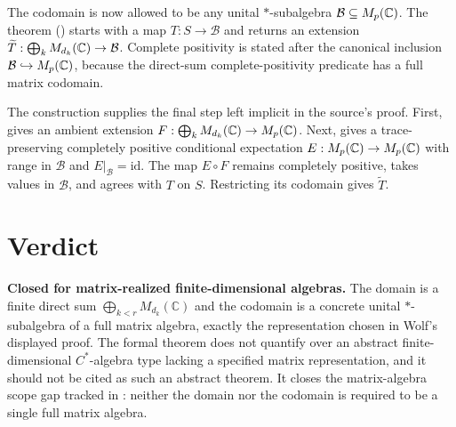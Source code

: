 \documentclass{article}
\begin{document}
The codomain is now allowed to be any unital $*$-subalgebra
$\mathcal B\subseteq M_{p}(\mathbb{C})$. The theorem
() starts with a
map $T:S\to\mathcal B$ and returns an extension
$\widetilde T:\bigoplus_kM_{d_k}(\mathbb{C})\to\mathcal B$. Complete positivity is stated
after the canonical inclusion $\mathcal B\hookrightarrow M_{p}(\mathbb{C})$, because the
direct-sum complete-positivity predicate has a full matrix codomain.

The construction supplies the final step left implicit in the source's proof.
First,  gives an
ambient extension $F:\bigoplus_kM_{d_k}(\mathbb{C})\to M_{p}(\mathbb{C})$. Next,
 gives a
trace-preserving completely positive conditional expectation
$E:M_{p}(\mathbb{C})\to M_{p}(\mathbb{C})$ with range in $\mathcal B$ and $E|_{\mathcal B}=\mathrm{id}$.
The map $E\circ F$ remains completely positive, takes values in $\mathcal B$,
and agrees with $T$ on $S$. Restricting its codomain gives $\widetilde T$.

\section{Verdict}

\textbf{Closed for matrix-realized finite-dimensional algebras.} The domain is
a finite direct sum $\bigoplus_{k<r}M_{d_k}(\mathbb C)$ and the codomain is a
concrete unital $*$-subalgebra of a full matrix algebra, exactly the
representation chosen in Wolf's displayed proof. The formal theorem does not
quantify over an abstract finite-dimensional $C^*$-algebra type lacking a
specified matrix representation, and it should not be cited as such an
abstract theorem. It closes the matrix-algebra scope gap tracked in
: neither the domain nor the codomain is required to be a single
full matrix algebra.



\end{document}
